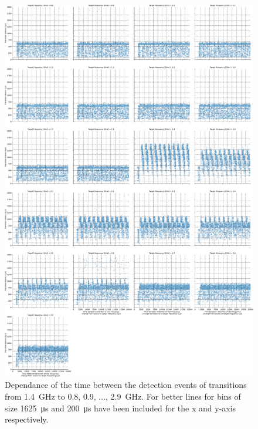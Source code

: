 \begin{figure}[]
    \centering
    \includegraphics[width=\columnwidth]{fig/ftalat_scatter_wait_transition_latency_hati_source_1.4.pdf}
    \caption{Dependance of the time between the detection events of transitions from \SI{1.4}{\GHz} to \SI{0.8}{}, \SI{0.9}{}, ..., \SI{2.9}{\GHz}. For better lines for bins of size \SI{1625}{\us} and \SI{200}{\us} have been included for the x and y-axis respectively.}
\end{figure}
